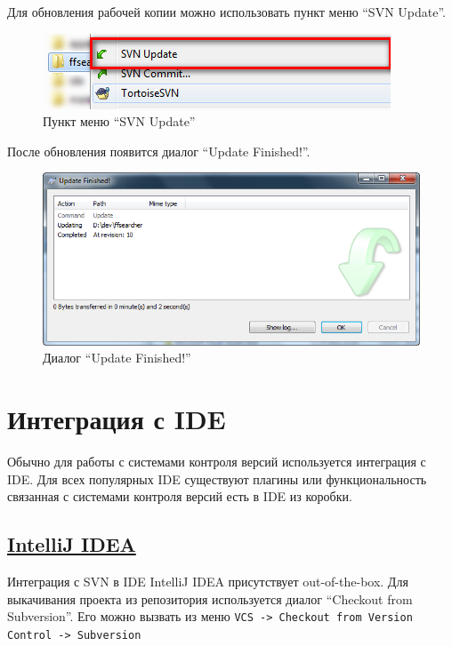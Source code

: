 \documentclass[a4paper,12pt]{article}
\begin{document}
Для обновления рабочей копии можно использовать пункт меню ``SVN
Update''.

\begin{figure}[h!]
	\centering
	\includegraphics[scale=0.60]{tortoisesvn-work-instractions-step-7.png}
	\vspace{-10pt}
	\caption{Пункт меню ``SVN Update''}
\end{figure}

После обновления появится диалог ``Update Finished!''.

\begin{figure}[h!]
	\centering
	\includegraphics[scale=0.60]{tortoisesvn-work-instractions-step-8.png}
	\vspace{-10pt}
	\caption{Диалог ``Update Finished!''}
\end{figure}

\clearpage

\section{Интеграция с IDE}

Обычно для работы с системами контроля версий используется интеграция с
IDE. Для всех популярных IDE существуют плагины или функциональность
связанная с системами контроля версий есть в IDE из коробки.

\subsection{\href{http://www.jetbrains.com/idea/}{IntelliJ IDEA}}
\setcounter{figure}{0}
Интеграция с SVN в IDE IntelliJ IDEA присутствует out-of-the-box. Для
выкачивания проекта из репозитория используется диалог ``Checkout from
Subversion''. Его можно вызвать из меню
\texttt{VCS -\textgreater{} Checkout from Version Control -\textgreater{} Subversion}
\end{document}
